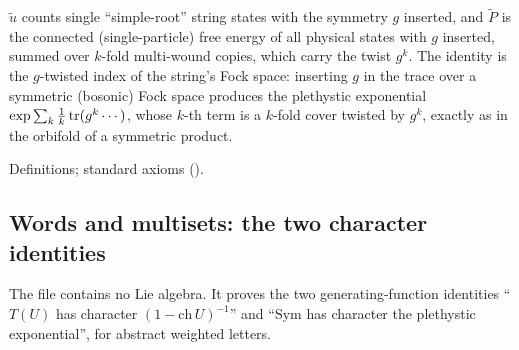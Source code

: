 \begin{physics}
$\tilde u$ counts single ``simple-root'' string states with the symmetry $g$ inserted, and $\tilde P$ is the connected
(single-particle) free energy of all physical states with $g$ inserted, summed over $k$-fold multi-wound copies, which carry
the twist $g^k$.  The identity is the $g$-twisted index of the string's Fock space: inserting $g$ in the trace over a
symmetric (bosonic) Fock space produces the plethystic exponential $\exp\sum_k\frac1k\operatorname{tr}(g^k\cdots)$, whose $k$-th term is a
$k$-fold cover twisted by $g^k$, exactly as in the orbifold of a symmetric product.
\end{physics}
\begin{status}Definitions; standard axioms ().\end{status}

\subsection{Words and multisets: the two character identities}

The file  contains no Lie algebra.  It proves the two
generating-function identities ``$T(U)$ has character $(1-\mathrm{ch}\,U)^{-1}$'' and ``$\mathrm{Sym}$ has character the plethystic
exponential'', for abstract weighted letters.


